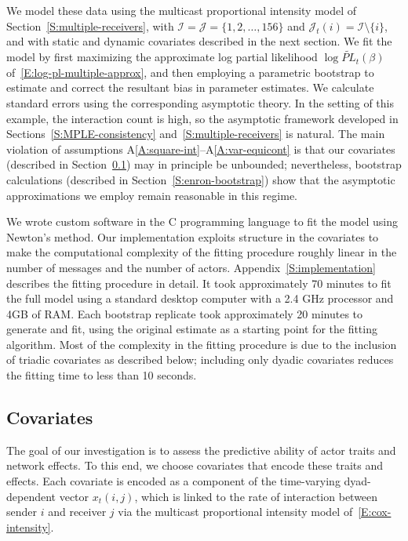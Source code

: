 \documentclass[final]{statsoc}
\begin{document}
We model these data using the multicast proportional intensity
model of Section~\ref{S:multiple-receivers}, with
$\mathcal{I} = \mathcal{J} = \{ 1, 2, \ldots, 156 \}$ and
$\mathcal{J}_t(i) = \mathcal{I} \setminus \{ i \}$, and with static and
dynamic covariates described in the next section.
We fit the model by first maximizing the approximate log partial
likelihood $\log \widetilde{\mathit{PL}}_t(\beta)$ of~\eqref{E:log-pl-multiple-approx}, and then employing a
parametric bootstrap to estimate and correct the resultant bias in
parameter estimates.  We calculate standard errors using the
corresponding asymptotic theory.
In the setting of this example, the interaction count is high, so
the asymptotic framework developed in Sections~\ref{S:MPLE-consistency}
and~\ref{S:multiple-receivers} is natural.  The main violation of assumptions
A\ref{A:square-int}--A\ref{A:var-equicont} is that our covariates (described in Section~\ref{S:enron-covariates}) may
in principle be unbounded; nevertheless, bootstrap calculations
(described in Section~\ref{S:enron-bootstrap}) show that the asymptotic approximations we employ remain reasonable in this regime.

We wrote custom software in the C programming language to fit the model using
Newton's method.  Our implementation exploits structure in the covariates to
make the computational complexity of the fitting procedure roughly linear in
the number of messages and the number of actors.
Appendix~\ref{S:implementation} describes the fitting procedure in detail.  It
took approximately 70 minutes to fit the full model using a standard desktop
computer with a 2.4 GHz processor and 4GB of RAM.  Each bootstrap replicate
took approximately 20 minutes to generate and fit, using the original estimate
as a starting point for the fitting algorithm.  Most of the complexity in the
fitting procedure is due to the inclusion of triadic covariates as described
below; including only dyadic covariates reduces the fitting time to less than
10 seconds.

\subsection{Covariates}\label{S:enron-covariates}

The goal of our investigation is to assess the predictive ability of actor traits and network effects.  To this end, we choose covariates that encode these traits and effects.  Each covariate is encoded as a component of the time-varying dyad-dependent vector $x_t(i,j)$, which is linked to the rate of interaction between sender $i$ and receiver $j$ via the multicast proportional intensity model of~\eqref{E:cox-intensity}.
\end{document}
